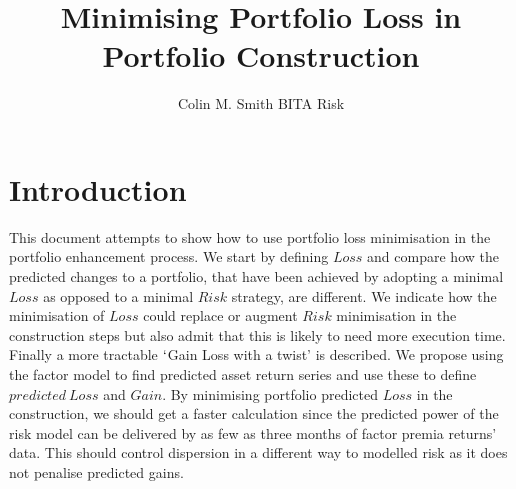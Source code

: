 \documentclass[12pt]{article}
\title{Minimising Portfolio Loss in Portfolio Construction}
\author{Colin M. Smith BITA Risk}
\begin{document}
\maketitle
\tableofcontents
\pagebreak
\doublespacing
\section{Introduction}
This document attempts to show how to use portfolio loss minimisation in the
portfolio enhancement process. We start by defining $Loss$ and compare how
the predicted changes to a portfolio, that have been achieved by adopting a minimal $Loss$ as opposed to a minimal $Risk$ 
strategy, are different. 
We indicate how the minimisation of
$Loss$ could replace or augment $Risk$ minimisation in the construction steps but also admit
that this is likely to need more execution time.
Finally a more tractable $`$Gain Loss with a twist' is described. We propose using
the factor model to find predicted asset return series and use these to define $predicted\ Loss$ and $Gain$. 
By minimising portfolio predicted $Loss$ in the construction, we should get a faster calculation since 
the predicted power of the risk model can be delivered by as few as three months of factor premia returns' data.
This should control dispersion in a different way to modelled risk as it does not penalise predicted gains.
\end{document}
